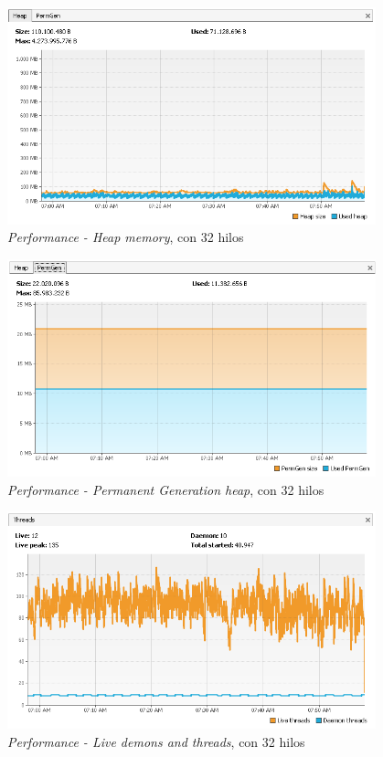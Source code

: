 \begin{figure}[H]
\centering
\includegraphics[width=0.95\textwidth]{images/Performance_HEAP_32_Threads}
\caption{\emph{Performance - Heap memory}, con 32 hilos}
\label{fig:6.29}
\end{figure}

\begin{figure}[H]
\centering
\includegraphics[width=0.95\textwidth]{images/Performance_PERM_32_Threads}
\caption{\emph{Performance - Permanent Generation heap}, con 32 hilos}
\label{fig:6.30}
\end{figure}

\begin{figure}[H]
\centering
\includegraphics[width=0.95\textwidth]{images/Performance_LIVE_32_Threads}
\caption{\emph{Performance - Live demons and threads}, con 32 hilos}
\label{fig:6.31}
\end{figure}

